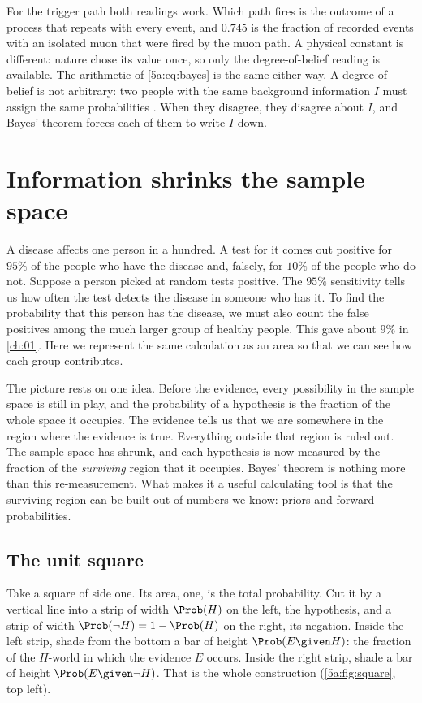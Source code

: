 For the trigger path both readings work. Which path fires is the outcome of a
process that repeats with every event, and $0.745$ is the fraction of recorded
events with an isolated muon that were fired by the muon path. A physical
constant is different: nature chose its value once, so only the degree-of-belief
reading is available. The arithmetic of \eqref{5a:eq:bayes} is the same either
way. A degree of belief is not arbitrary: two people with the same background
information $I$ must assign the same probabilities . When
they disagree, they disagree about $I$, and Bayes' theorem forces each of them
to write $I$ down.
\section{Information shrinks the sample space}
\label{5a:sec:shrink}

A disease affects one person in a hundred. A test for it comes out positive for
$95\%$ of the people who have the disease and, falsely, for $10\%$ of the people
who do not. Suppose a person picked at random tests positive. The $95\%$ sensitivity
tells us how often the test detects the disease in someone who has it. To
find the probability that this person has the disease, we must also count
the false positives among the much larger group of healthy people. This
gave about $9\%$ in \cref{ch:01}. Here we represent the same calculation
as an area so that we can see how each group contributes.

The picture rests on one idea. Before the evidence, every possibility in the
sample space is still in play, and the probability of a hypothesis is the
fraction of the whole space it occupies. The evidence tells us that we are
somewhere in the region where the evidence is true. Everything outside that
region is ruled out. The sample space has shrunk, and each hypothesis is now
measured by the fraction of the \emph{surviving} region that it occupies.
Bayes' theorem is nothing more than
this re-measurement. What makes it a useful calculating tool is that the
surviving region can be built out of numbers we know: priors and forward
probabilities.

\subsection{The unit square}

Take a square of side one. Its area, one, is the total probability. Cut it by a
vertical line into a strip of width $\Prob(H)$ on the left, the hypothesis, and a
strip of width $\Prob(\neg H)=1-\Prob(H)$ on the right, its negation. Inside the
left strip, shade from the bottom a bar of height $\Prob(E\given H)$: the fraction
of the $H$-world in which the evidence $E$ occurs. Inside the right strip, shade a
bar of height $\Prob(E\given\neg H)$. That is the whole construction
(\cref{5a:fig:square}, top left).

